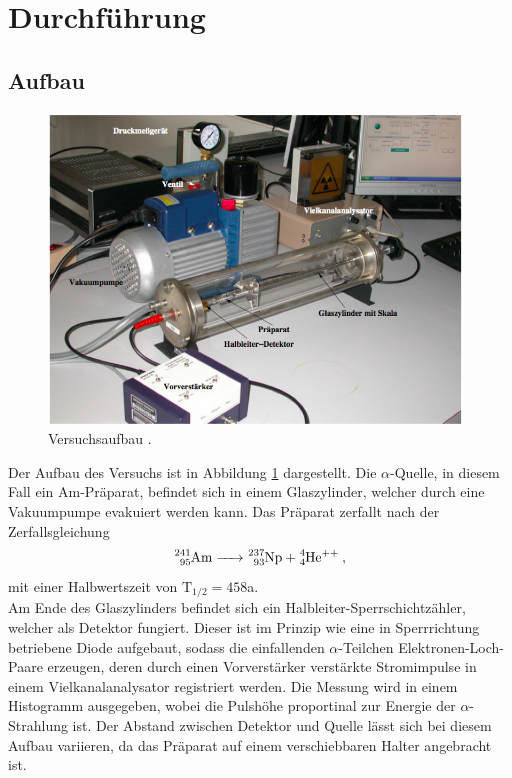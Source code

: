 \section{Durchführung}
\label{sec:Durchführung}
\subsection{Aufbau}
\begin{figure}
  \centering
  \includegraphics[width=11cm]{aufbau.png}
  \caption{Versuchsaufbau \cite{skript}.}
  \label{fig:aufbau}
\end{figure}
Der Aufbau des Versuchs ist in Abbildung \ref{fig:aufbau} dargestellt.
Die $\alpha$-Quelle, in diesem Fall ein Am-Präparat, befindet sich
in einem Glaszylinder, welcher durch eine Vakuumpumpe evakuiert werden kann.
Das Präparat zerfallt nach der Zerfallsgleichung
\begin{equation}
  \ce{^{241}_{95}Am -> ^{237}_{93}Np + ^{4}_{4}He^{++}} \:,
  \label{eqn:reak}
\end{equation}
mit einer Halbwertszeit von $\text{T}_{1/2}= 458$a.\\
Am Ende des Glaszylinders befindet sich ein Halbleiter-Sperrschichtzähler, welcher
als Detektor fungiert. Dieser ist im Prinzip wie eine in Sperrrichtung betriebene
Diode aufgebaut, sodass die einfallenden $\alpha$-Teilchen Elektronen-Loch-Paare
erzeugen, deren durch einen Vorverstärker verstärkte Stromimpulse in einem
Vielkanalanalysator registriert werden. Die Messung wird in einem Histogramm ausgegeben,
wobei die Pulshöhe proportinal zur Energie der $\alpha$-Strahlung ist.
Der Abstand zwischen Detektor und Quelle lässt sich bei diesem Aufbau variieren, da das
Präparat auf einem verschiebbaren Halter angebracht ist.
